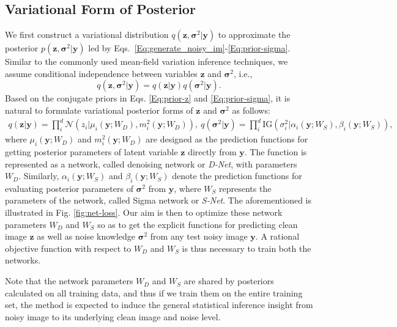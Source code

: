 \documentclass{article}
\begin{document}
\vspace{-2mm}\subsection{Variational Form of Posterior}\vspace{-2mm}
We first construct a variational distribution $q(\bm{z}, \bm{\sigma}^2|\bm{y})$ to approximate the
posterior $p(\bm{z}, \bm{\sigma}^2|\bm{y})$ led by Eqs.~\eqref{Eq:generate_noisy_im}-\eqref{Eq:prior-sigma}. Similar to
the commonly used mean-field variation inference techniques, we assume
conditional independence between variables $\bm{z}$ and $\bm{\sigma}^2$, i.e.,
\begin{equation}
    q(\bm{z}, \bm{\sigma}^2|\bm{y})=q(\bm{z}|\bm{y})q(\bm{\sigma}^2|\bm{y}).
    \label{Eq:posterior-factor-asumption}
\end{equation}
Based on the conjugate priors in Eqs. \eqref{Eq:prior-z} and \eqref{Eq:prior-sigma}, it is natural to
formulate variational posterior forms of $\bm{z}$ and $\bm{\sigma}^2$ as follows:
\begin{align}
    q(\bm{z}|\bm{y}) = \prod_i^d \mathcal{N}(z_i|\mu_i(\bm{y};W_{D}), m_i^2(\bm{y};W_{D})), \
    q(\bm{\sigma}^2|\bm{y}) = \prod_i^d \text{IG}(\sigma_i^2|\alpha_i(\bm{y};W_{S}), \beta_i(\bm{y};W_{S})),
    \label{Eq:distribution_z_sigma}
\end{align}
where $\mu_i(\bm{y};W_{D})$ and $m_i^2(\bm{y};W_{D})$ are designed as the prediction functions for getting
posterior parameters of latent variable $\bm{z}$ directly from $\bm{y}$. The function is represented as a network,
called denoising network or \textit{D-Net}, with parameters $W_{D}$. Similarly, $\alpha_i(\bm{y};W_{S})$ and
$\beta_i(\bm{y};W_{S})$ denote the prediction functions for evaluating posterior parameters of
$\bm{\sigma}^2$ from $\bm{y}$, where $W_{S}$ represents the parameters of the network, called Sigma network or \textit{S-Net}.
The aforementioned is illustrated in Fig. \ref{fig:net-loss}. Our aim is then to optimize
these network parameters $W_{D}$ and $W_{S}$ so as to get the explicit functions for predicting clean image
$\bm{z}$ as well as noise knowledge $\bm{\sigma}^2$ from any test noisy image $\bm{y}$. A rational objective
function with respect to $W_{D}$ and $W_{S}$ is thus necessary
to train both the networks.

Note that the network parameters $W_{D}$ and $W_{S}$ are shared by posteriors calculated on all training data, and
thus if we train them on the entire training set, the method is expected to induce the general statistical inference
insight from noisy image to its underlying clean image and noise level.
\end{document}

